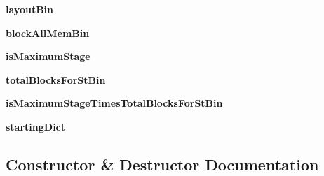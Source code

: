\begin{DoxyCompactItemize}
\item 
\hypertarget{classmapper_1_1src_1_1rmt_1_1orig__rmt__compiler_1_1_rmt_ilp_compiler_a656d6638c3013d87b19cd00e2cefe735}{}{\bfseries layout\+Bin}\label{classmapper_1_1src_1_1rmt_1_1orig__rmt__compiler_1_1_rmt_ilp_compiler_a656d6638c3013d87b19cd00e2cefe735}

\item 
\hypertarget{classmapper_1_1src_1_1rmt_1_1orig__rmt__compiler_1_1_rmt_ilp_compiler_a6cc9f478621f9bcf087caf0e17196672}{}{\bfseries block\+All\+Mem\+Bin}\label{classmapper_1_1src_1_1rmt_1_1orig__rmt__compiler_1_1_rmt_ilp_compiler_a6cc9f478621f9bcf087caf0e17196672}

\item 
\hypertarget{classmapper_1_1src_1_1rmt_1_1orig__rmt__compiler_1_1_rmt_ilp_compiler_a8c337dccc7f163194ff11332e51fcc0c}{}{\bfseries is\+Maximum\+Stage}\label{classmapper_1_1src_1_1rmt_1_1orig__rmt__compiler_1_1_rmt_ilp_compiler_a8c337dccc7f163194ff11332e51fcc0c}

\item 
\hypertarget{classmapper_1_1src_1_1rmt_1_1orig__rmt__compiler_1_1_rmt_ilp_compiler_af81f466a5667041b5490e5d322b1f728}{}{\bfseries total\+Blocks\+For\+St\+Bin}\label{classmapper_1_1src_1_1rmt_1_1orig__rmt__compiler_1_1_rmt_ilp_compiler_af81f466a5667041b5490e5d322b1f728}

\item 
\hypertarget{classmapper_1_1src_1_1rmt_1_1orig__rmt__compiler_1_1_rmt_ilp_compiler_a0951da1cc28b04c6a0524da285227e2b}{}{\bfseries is\+Maximum\+Stage\+Times\+Total\+Blocks\+For\+St\+Bin}\label{classmapper_1_1src_1_1rmt_1_1orig__rmt__compiler_1_1_rmt_ilp_compiler_a0951da1cc28b04c6a0524da285227e2b}

\item 
\hypertarget{classmapper_1_1src_1_1rmt_1_1orig__rmt__compiler_1_1_rmt_ilp_compiler_a7b9e9e2ffca48daf68634c60de32e62b}{}{\bfseries starting\+Dict}\label{classmapper_1_1src_1_1rmt_1_1orig__rmt__compiler_1_1_rmt_ilp_compiler_a7b9e9e2ffca48daf68634c60de32e62b}

\end{DoxyCompactItemize}


\subsection{Constructor \& Destructor Documentation}
\hypertarget{classmapper_1_1src_1_1rmt_1_1orig__rmt__compiler_1_1_rmt_ilp_compiler_af84883e69fc6fb64376308b9c0879ae1}{}

